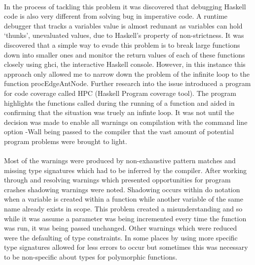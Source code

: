 \documentclass[main.tex]{subfiles}
\begin{document}
\paragraph{} In the process of tackling this problem it was discovered that debugging Haskell code is also very different from solving bug in imperative code. A runtime debugger that tracks a variables value is almost redunant as variables can hold `thunks', unevaluated values, due to Haskell's property of non-strictness. It was discovered that a simple way to evade this problem is to break large functions down into smaller ones and monitor the return values of each of these functions closely using ghci, the interactive Haskell console. However, in this instance this approach only allowed me to narrow down the problem of the infinite loop to the function procEdgeAntNode. Further research into the issue introduced a program for code coverage called HPC (Haskell Program coverage tool). The program highlights the functions called during the running of a function and aided in confirming that the situation was truely an infinte loop. It was not until the decision was made to enable all warnings on compilation with the command line option -Wall being passed to the compiler that the vast amount of potential program problems were brought to light.

\paragraph{} Most of the warnings were produced by non-exhaustive pattern matches and missing type signatures which had to be inferred by the compiler. After working through and resolving warnings which presented opportunities for program crashes shadowing warnings were noted. Shadowing occurs within do notation when a variable is created within a function while another variable of the same name already exists in scope. This problem created a misunderstanding and so while it was assume a parameter was being incremented every time the function was run, it was being passed unchanged. Other warnings which were reduced were the defaulting of type constraints. In some places by using more specific type signatures allowed for less errors to occur but sometimes this was necessary to be non-specific about types for polymorphic functions.

\end{document}
